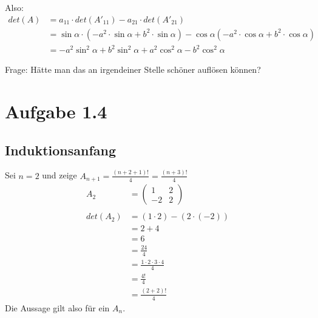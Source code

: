 \documentclass{article} %
\begin{document}
Also:
\begin{align*}
    det(A) & = a_{11} \cdot det(A'_{11}) - a_{21} \cdot det(A'_{21})   \\
    & = \sin \alpha \cdot (-a^2 \cdot \sin \alpha  + b^2 \cdot \sin \alpha) - \cos \alpha (-a^2 \cdot \cos \alpha  + b^2 \cdot \cos \alpha)  \\
    & = -a^2 \sin^2 \alpha  + b^2 \sin^2 \alpha + a^2 \cos^2 \alpha -b^2 \cos^2 \alpha
\end{align*}

Frage: Hätte man das an irgendeiner Stelle schöner auflösen können? 

\section{Aufgabe 1.4}
\subsection*{Induktionsanfang}
Sei \(n = 2\) und zeige $A_{n+1} = \frac{(n+2+1)!}{4} = \frac{(n+3)!}{4}$
\begin{align*}
A_2 & = \begin{pmatrix}
1 & 2 \\
-2 & 2
\end{pmatrix}   \\ \\
det (A_2 ) & = (1 \cdot 2) - (2 \cdot (-2)) \\
& = 2 + 4 \\
& = 6 \\
& = \frac{24}{4} \\
& = \frac{1\cdot 2 \cdot 3 \cdot 4 }{4} \\
& = \frac{4!}{4} \\
& = \frac{(2+2)!}{4}
\end{align*}
Die Aussage gilt also für ein $A_n$. 
\end{document}

